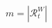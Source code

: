 \documentclass[preview]{standalone}
\begin{document}
\begin{center}
$m=|\mathcal{R}^W_t|$
\end{center}
\end{document}
